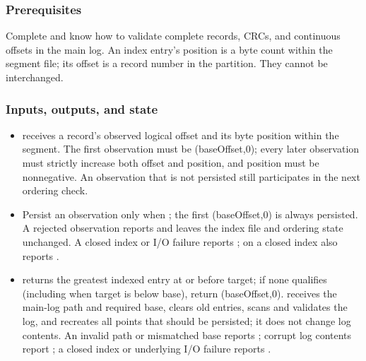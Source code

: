 \subsubsection*{Prerequisites}
Complete  and know how to validate complete records, CRCs, and continuous offsets in the main log. An index entry's position is a byte count within the segment file; its offset is a record number in the partition. They cannot be interchanged.
\subsubsection*{Inputs, outputs, and state}
\begin{itemize}
\item {} receives a record's observed logical offset and its byte position within the segment. The first observation must be (baseOffset,0); every later observation must strictly increase both offset and position, and position must be nonnegative. An observation that is not persisted still participates in the next ordering check.
\item Persist an observation only when ; the first (baseOffset,0) is always persisted. A rejected observation reports  and leaves the index file and ordering state unchanged. A closed index or I/O failure reports ;  on a closed index also reports .
\item {} returns the greatest indexed entry at or before target; if none qualifies (including when target is below base), return (baseOffset,0).  receives the main-log path and required base, clears old entries, scans and validates the log, and recreates all points that should be persisted; it does not change log contents. An invalid path or mismatched base reports ; corrupt log contents report ; a closed index or underlying I/O failure reports .
\end{itemize}
